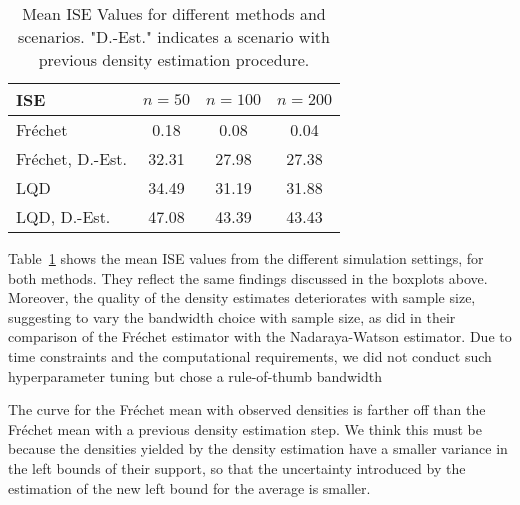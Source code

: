 \begin{table}[h!]
    \centering
    \begin{tabular}{lccc}
        \hline
        ISE & $n = 50$ & $n = 100$ & $n = 200$ \\
        \hline
        Fréchet             & 0.18 & 0.08 & 0.04 \\
        Fréchet, D.-Est.    & 32.31 & 27.98 & 27.38 \\
        LQD                 & 34.49 & 31.19 & 31.88 \\
        LQD, D.-Est.        & 47.08 & 43.39 & 43.43 \\
        \hline
    \end{tabular}
    \caption{Mean ISE Values for different methods and scenarios. "D.-Est." indicates
    a scenario with previous density estimation procedure.}
    \label{tab:mean_ise_values}
\end{table}
Table~\ref{tab:mean_ise_values} shows the mean ISE values from the different simulation
settings, for both methods. They reflect the same findings discussed in the boxplots
above.
Moreover, the quality of the density estimates deteriorates with sample size, suggesting
to vary the bandwidth choice with sample size, as \textcite{PetersenMüller2019} did in
their comparison of the Fréchet estimator with the Nadaraya-Watson estimator. Due to
time constraints and the computational requirements, we did not conduct such
hyperparameter tuning but chose a rule-of-thumb bandwidth
\parencites[Chapter~3.4.1]{Silverman1986}[Chapter~2.2.1]{LiRacine2007}

The curve for the Fréchet mean with observed densities is farther off than the Fréchet
mean with a previous density estimation step. We think this must be because the densities
yielded by the density estimation have a smaller variance in the left bounds of their
support, so that the uncertainty introduced by the estimation of the new left bound for
the average is smaller.
